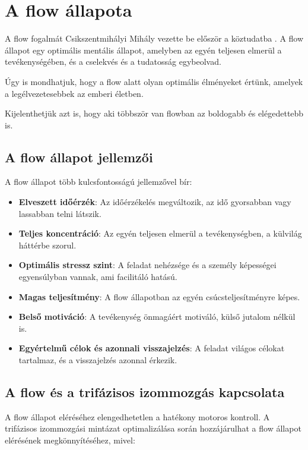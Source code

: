 \section{A flow állapota}

A flow fogalmát Csikszentmihályi Mihály vezette be először a köztudatba \cite{cziksentmihalyi1990flow}. A flow állapot egy optimális mentális állapot, amelyben az egyén teljesen elmerül a tevékenységében, és a cselekvés és a tudatosság egybeolvad.

Úgy is mondhatjuk, hogy a flow alatt olyan optimális élményeket értünk, amelyek a legélvezetesebbek az emberi életben. 

Kijelenthetjük azt is, hogy aki többször van flowban az boldogabb és elégedettebb is.

\subsection{A flow állapot jellemzői}
\label{sec:flow-jellemzok}

A flow állapot több kulcsfontosságú jellemzővel bír:

\begin{itemize}
    \item \textbf{Elveszett időérzék}: Az időérzékelés megváltozik, az idő gyorsabban vagy lassabban telni látszik.
    \item \textbf{Teljes koncentráció}: Az egyén teljesen elmerül a tevékenységben, a külvilág háttérbe szorul.
    \item \textbf{Optimális stressz szint}: A feladat nehézsége és a személy képességei egyensúlyban vannak, ami facilitáló hatású.
    \item \textbf{Magas teljesítmény}: A flow állapotban az egyén csúcsteljesítményre képes.
    \item \textbf{Belső motiváció}: A tevékenység önmagáért motiváló, külső jutalom nélkül is.
    \item \textbf{Egyértelmű célok és azonnali visszajelzés}: A feladat világos célokat tartalmaz, és a visszajelzés azonnal érkezik.
\end{itemize}

\subsection{A flow és a trifázisos izommozgás kapcsolata}

A flow állapot eléréséhez elengedhetetlen a hatékony motoros kontroll. A trifázisos izommozgási mintázat optimalizálása során \cite{improvement-in-ballistic-movement} hozzájárulhat a flow állapot elérésének megkönnyítéséhez, mivel:

